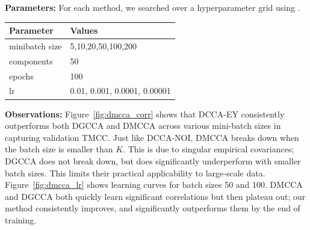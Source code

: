 \textbf{Parameters:} For each method, we searched over a hyperparameter grid using \citet{wandb}.

\begin{table}[h!] 
\centering 
\begin{tabular}{|l|l|} 
\hline Parameter & Values \\ 
\hline minibatch size & 5,10,20,50,100,200 \\ 
\hline components & 50 \\ 
\hline epochs & 100 \\ 
\hline lr & 0.01, 0.001, 0.0001, 0.00001 \\ 
\hline 
\end{tabular}
\end{table}

\textbf{Observations:}
Figure~\ref{fig:dmcca_corr} shows that DCCA-EY consistently outperforms both DGCCA and DMCCA across various mini-batch sizes in capturing validation TMCC.
Just like DCCA-NOI, DMCCA breaks down when the batch size is smaller than $K$. This is due to singular empirical covariances; DGCCA does not break down, but does significantly underperform with smaller batch sizes.
This limits their practical applicability to large-scale data.
Figure~\ref{fig:dmcca_lr} shows learning curves for batch sizes 50 and 100.
DMCCA and DGCCA both quickly learn significant correlations but then plateau out; our method consistently improves, and significantly outperforms them by the end of training.


